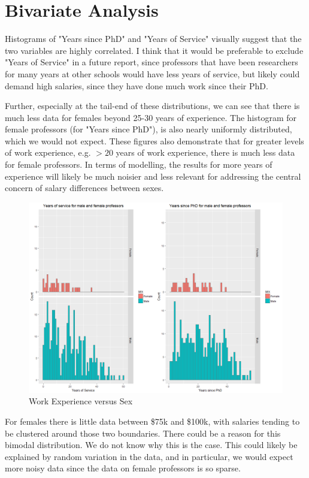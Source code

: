 \documentclass{article}
\begin{document}
\newpage

\section{Bivariate Analysis}

Histograms of "Years since PhD" and "Years of Service" visually suggest that the two variables are highly correlated. I think that it would be preferable to exclude "Years of Service" in a future report, since professors that have been researchers for many years at other schools would have less years of service, but likely could demand high salaries, since they have done much work since their PhD. 

Further, especially at the tail-end of these distributions, we can see that there is much less data for females beyond 25-30 years of experience. 
The histogram for female professors (for "Years since PhD"), is also nearly uniformly distributed, which we would not expect. These figures also demonstrate that for greater levels of work experience, e.g. $>20$ years of work experience, there is much less data for female professors. In terms of modelling, the results for more years of experience will likely be much noisier and less relevant for addressing the central concern of salary differences between sexes.

\begin{figure}[!htb]
    \centering
    \includegraphics[scale=0.5]{YrsSex}
    \caption{Work Experience versus Sex}
    \label{pairs1}
\end{figure}

For females there is little data between \$75k and \$100k, with salaries tending to be clustered around those two boundaries. There could be a reason for this bimodal distribution. We do not know why this is the case. This could likely be explained by random variation in the data, and in particular, we would expect more noisy data since the data on female professors is so sparse.
\end{document}
